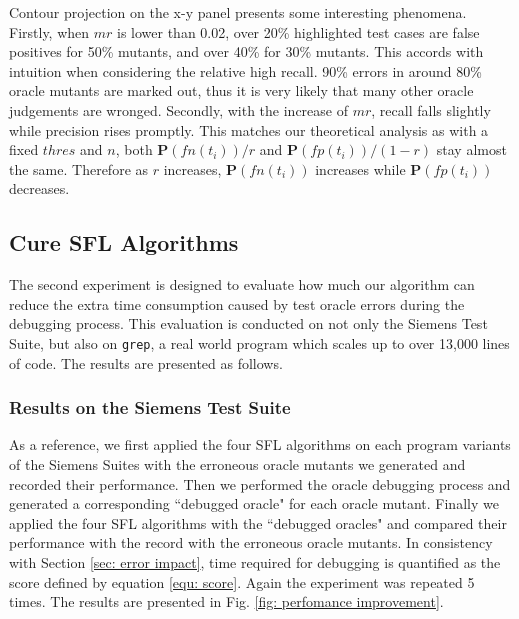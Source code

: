 Contour projection on the x-y panel presents some interesting phenomena.
Firstly, when $mr$ is lower than 0.02, over 20\% highlighted test cases are false positives for 50\% mutants, and over 40\% for 30\% mutants. This accords with intuition when considering the relative high recall. 90\% errors in around  80\% oracle mutants are marked out, thus it is very likely that many other oracle judgements are wronged. 
Secondly, with the increase of $mr$, recall falls slightly while precision rises promptly. This matches our theoretical analysis as with a fixed $thres$ and $n$, both $\mathbf{P}(fn(t_i))/r$ and $\mathbf{P}(fp(t_i))/(1-r)$ stay almost the same. Therefore as $r$ increases, $\mathbf{P}(fn(t_i))$ increases while $\mathbf{P}(fp(t_i))$ decreases.


\subsection{Cure SFL Algorithms}

The second experiment is designed to evaluate how much our algorithm can reduce the extra time consumption caused by test oracle errors during the debugging process. This evaluation is conducted on not only the Siemens Test Suite, but also on \texttt{grep}, a real world program which scales up to over 13,000 lines of code. The results are presented as follows.

\subsubsection{Results on the Siemens Test Suite}
As a reference, we first applied the four SFL algorithms on each program variants of the Siemens Suites with the erroneous oracle mutants we generated and recorded their performance. Then we performed the oracle debugging process and generated a corresponding ``debugged oracle" for each oracle mutant. Finally we applied the four SFL algorithms with the ``debugged oracles" and compared their performance with the record with the erroneous oracle mutants.
In consistency with Section \ref{sec: error impact}, time required for debugging is quantified as the score defined by equation \ref{equ: score}. Again the experiment was repeated 5 times. The results are presented in Fig. \ref{fig: perfomance improvement}.

